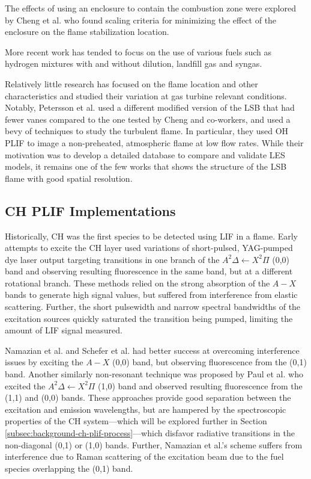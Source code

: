 The effects of using an enclosure to contain the combustion zone were explored by Cheng et al.\cite{2008-cheng-c} who found scaling criteria for minimizing the effect of the enclosure on the flame stabilization location.

More recent work has tended to focus on the use of various fuels such as hydrogen mixtures\cite{2008-cheng-b} with and without dilution\cite{2007-littlejohn}, landfill gas\cite{2008-cheng-a,2009-cheng} and syngas\cite{2010-littlejohn}.

Relatively little research has focused on the flame location and other characteristics and studied their variation at gas turbine relevant conditions.
Notably, Petersson et al.\cite{2007-petersson} used a different modified version of the LSB that had fewer vanes compared to the one tested by Cheng and co-workers, and used a bevy of techniques to study the turbulent flame.
In particular, they used OH PLIF to image a non-preheated, atmospheric flame at low flow rates.
While their motivation was to develop a detailed database to compare and validate LES models, it remains one of the few works that shows the structure of the LSB flame with good spatial resolution.

\subsection{CH PLIF Implementations}

Historically, CH was the first species to be detected using LIF in a flame.\cite{1973-barnes}
Early attempts\cite{1981-verdieck,1986-allen} to excite the CH layer used variations of short-pulsed, YAG-pumped dye laser output targeting transitions in one branch of the \(A^2\Delta\leftarrow X^2\Pi\) (0,0) band and observing resulting fluorescence in the same band, but at a different rotational branch.
These methods relied on the strong absorption of the \(A-X\) bands to generate high signal values, but suffered from interference from elastic scattering.
Further, the short pulsewidth and narrow spectral bandwidths of the excitation sources quickly saturated the transition being pumped, limiting the amount of LIF signal measured.

Namazian et al.\cite{1986-namazian} and Schefer et al.\cite{1994-schefer} had better success at overcoming interference issues by exciting the \(A-X\) (0,0) band, but observing fluorescence from the (0,1) band.
Another similarly non-resonant technique was proposed by Paul et al.\cite{1994-paul} who excited the \(A^2\Delta\leftarrow X^2\Pi\) (1,0) band and observed resulting fluorescence from the (1,1) and (0,0) bands.
These approaches provide good separation between the excitation and emission wavelengths, but are hampered by the spectroscopic properties of the CH system---which will be explored further in Section \ref{subsec:background-ch-plif-process}---which disfavor radiative transitions in the non-diagonal (0,1) or (1,0) bands.
Further, Namazian et al.'s scheme suffers from interference due to Raman scattering of the excitation beam due to the fuel species overlapping the (0,1) band.

